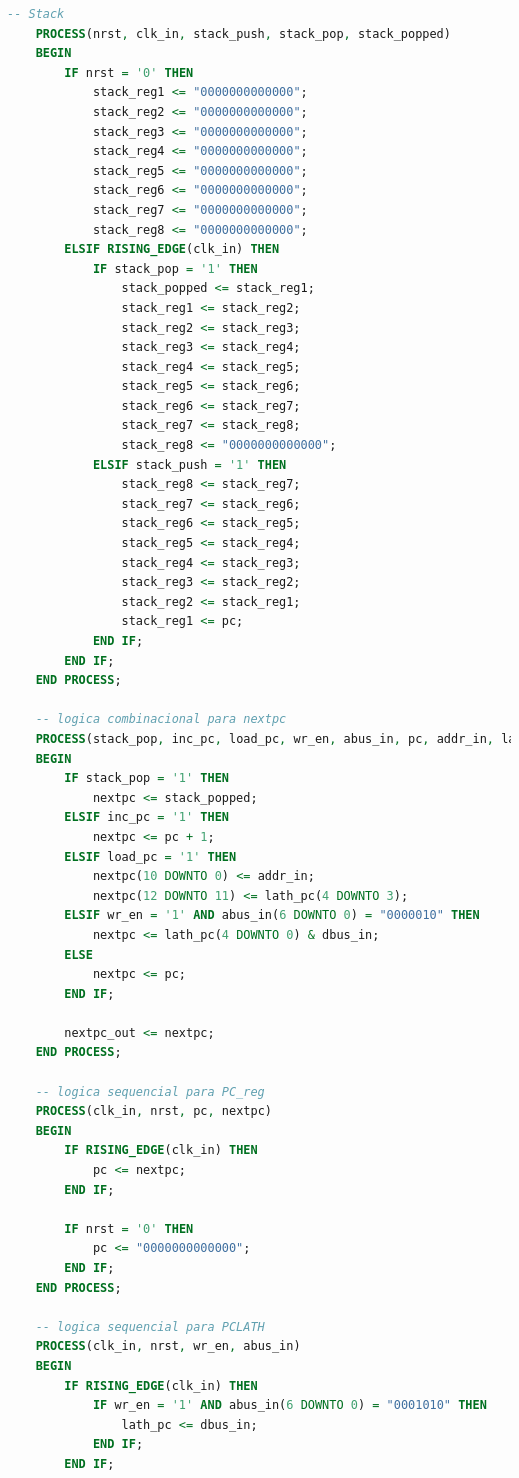 \documentclass{article}
\begin{document}
\begin{lstlisting}[language=VHDL, caption={Código VHDL pc\_reg}]
    -- Stack
    PROCESS(nrst, clk_in, stack_push, stack_pop, stack_popped)
    BEGIN
        IF nrst = '0' THEN
            stack_reg1 <= "0000000000000";
            stack_reg2 <= "0000000000000";
            stack_reg3 <= "0000000000000";
            stack_reg4 <= "0000000000000";
            stack_reg5 <= "0000000000000";
            stack_reg6 <= "0000000000000";
            stack_reg7 <= "0000000000000";
            stack_reg8 <= "0000000000000";
        ELSIF RISING_EDGE(clk_in) THEN
            IF stack_pop = '1' THEN
                stack_popped <= stack_reg1;
                stack_reg1 <= stack_reg2;
                stack_reg2 <= stack_reg3;
                stack_reg3 <= stack_reg4;
                stack_reg4 <= stack_reg5;
                stack_reg5 <= stack_reg6;
                stack_reg6 <= stack_reg7;
                stack_reg7 <= stack_reg8;
                stack_reg8 <= "0000000000000";
            ELSIF stack_push = '1' THEN
                stack_reg8 <= stack_reg7;
                stack_reg7 <= stack_reg6;
                stack_reg6 <= stack_reg5;
                stack_reg5 <= stack_reg4;
                stack_reg4 <= stack_reg3;
                stack_reg3 <= stack_reg2;
                stack_reg2 <= stack_reg1;
                stack_reg1 <= pc; 
            END IF;
        END IF;
    END PROCESS;

    -- logica combinacional para nextpc
    PROCESS(stack_pop, inc_pc, load_pc, wr_en, abus_in, pc, addr_in, lath_pc, stack_popped, dbus_in)
    BEGIN
        IF stack_pop = '1' THEN
            nextpc <= stack_popped;
        ELSIF inc_pc = '1' THEN
            nextpc <= pc + 1;
        ELSIF load_pc = '1' THEN
            nextpc(10 DOWNTO 0) <= addr_in;
            nextpc(12 DOWNTO 11) <= lath_pc(4 DOWNTO 3);
        ELSIF wr_en = '1' AND abus_in(6 DOWNTO 0) = "0000010" THEN
            nextpc <= lath_pc(4 DOWNTO 0) & dbus_in;
        ELSE
            nextpc <= pc;
        END IF;
        
        nextpc_out <= nextpc;
    END PROCESS;

    -- logica sequencial para PC_reg
    PROCESS(clk_in, nrst, pc, nextpc)
    BEGIN
        IF RISING_EDGE(clk_in) THEN
            pc <= nextpc;
        END IF;

        IF nrst = '0' THEN
            pc <= "0000000000000";
        END IF;
    END PROCESS;

    -- logica sequencial para PCLATH
    PROCESS(clk_in, nrst, wr_en, abus_in)
    BEGIN
        IF RISING_EDGE(clk_in) THEN
            IF wr_en = '1' AND abus_in(6 DOWNTO 0) = "0001010" THEN
                lath_pc <= dbus_in;
            END IF;
        END IF;
        

\end{lstlisting}
\end{document}
